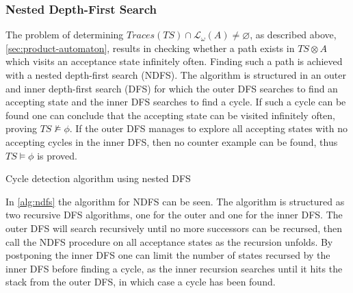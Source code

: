 \subsubsection{Nested Depth-First Search}
The problem of determining $Traces(TS) \cap \mathcal{L_\omega}(A) \neq \varnothing$, as described above, \autoref{sec:product-automaton}, results in checking whether a path exists in $TS \otimes A$ which visits an acceptance state infinitely often. Finding such a path is achieved with a nested depth-first search (NDFS). The algorithm is structured in an outer and inner depth-first search (DFS) for which the outer DFS searches to find an accepting state and the inner DFS searches to find a cycle. If such a cycle can be found one can conclude that the accepting state can be visited infinitely often, proving $TS \not\models \phi$. If the outer DFS manages to explore all accepting states with no accepting cycles in the inner DFS, then no counter example can be found, thus $TS \models \phi$ is proved.
\begin{algorithm}[H]
\SetAlgoLined
\DontPrintSemicolon
{}
\;

\caption{Cycle detection algorithm using nested DFS}
\label{alg:ndfs}
\end{algorithm}
In \autoref{alg:ndfs} the algorithm for NDFS can be seen. The algorithm is structured as two recursive DFS algorithms, one for the outer and one for the inner DFS. The outer DFS will search recursively until no more successors can be recursed, then call the NDFS procedure on all acceptance states as the recursion unfolds. By postponing the inner DFS one can limit the number of states recursed by the inner DFS before finding a cycle, as the inner recursion searches until it hits the stack from the outer DFS, in which case a cycle has been found. 

